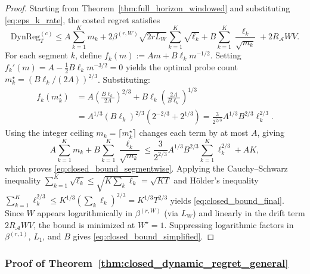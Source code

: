 \documentclass{article}
\newcommand{\cA}{\mathcal{A}}
\newcommand{\DynReg}{\mathrm{DynReg}}
\begin{document}
\begin{proof}
Starting from Theorem~\ref{thm:full_horizon_windowed} and substituting \eqref{eq:eps_k_rate}, the costed regret satisfies
\[
\DynReg_T^{(c)} \le A\sum_{k=1}^K m_k + 2\beta^{(r,W)}\sqrt{2rL_W}\sum_{k=1}^K \sqrt{\ell_k} + B\sum_{k=1}^K \frac{\ell_k}{\sqrt{m_k}} + 2R_{\cA}WV.
\]
For each segment $k$, define $f_k(m) := Am + B\ell_k m^{-1/2}$. Setting $f_k'(m) = A - \tfrac{1}{2}B\ell_k m^{-3/2} = 0$ yields the optimal probe count $m_k^\star = (B\ell_k/(2A))^{2/3}$. Substituting:
\begin{align*}
f_k(m_k^\star) &= A\!\left(\frac{B\ell_k}{2A}\right)^{\!2/3} + B\ell_k\!\left(\frac{2A}{B\ell_k}\right)^{\!1/3} \\
&= A^{1/3}(B\ell_k)^{2/3}\!\left(2^{-2/3}+2^{1/3}\right) = \frac{3}{2^{2/3}}A^{1/3}B^{2/3}\ell_k^{2/3}.
\end{align*}
Using the integer ceiling $m_k = \lceil m_k^\star \rceil$ changes each term by at most $A$, giving
\[
A\sum_{k=1}^K m_k + B\sum_{k=1}^K \frac{\ell_k}{\sqrt{m_k}} \le \frac{3}{2^{2/3}} A^{1/3} B^{2/3} \sum_{k=1}^K \ell_k^{2/3} + AK,
\]
which proves \eqref{eq:closed_bound_segmentwise}.
Applying the Cauchy--Schwarz inequality $\sum_{k=1}^K \sqrt{\ell_k} \le \sqrt{K \sum_k \ell_k} = \sqrt{KT}$ and H\"older's inequality $\sum_{k=1}^K \ell_k^{2/3} \le K^{1/3}\!\left(\sum_k \ell_k\right)^{2/3} = K^{1/3}T^{2/3}$ yields \eqref{eq:closed_bound_final}.
Since $W$ appears logarithmically in $\beta^{(r,W)}$ (via $L_W$) and linearly in the drift term $2R_{\cA}WV$, the bound is minimized at $W^\star = 1$.
Suppressing logarithmic factors in $\beta^{(r,1)}$, $L_1$, and $B$ gives \eqref{eq:closed_bound_simplified}.
\end{proof}

\subsubsection{Proof of Theorem~\ref{thm:closed_dynamic_regret_general}}
\label{proof:regret_misspecified_variance}
\end{document}
